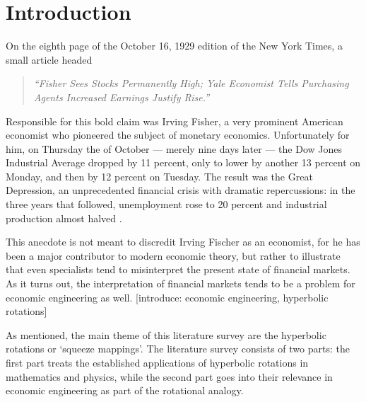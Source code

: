 \chapter{Introduction}
\label{chap:intro}
On the eighth page of the October 16, 1929 edition of the New York Times, a small article headed \cite{NYT1929}
\begin{quote}
    \emph{``Fisher Sees Stocks Permanently High; Yale Economist Tells Purchasing Agents Increased Earnings Justify Rise.''} 
\end{quote}
Responsible for this bold claim was Irving Fisher, a very prominent American economist who pioneered  the subject of monetary economics. Unfortunately for him, on Thursday the  of October --- merely nine days later --- the Dow Jones Industrial Average dropped by 11 percent, only to lower by another 13 percent on Monday, and then by 12 percent on Tuesday. The result was the Great Depression, an unprecedented financial crisis with dramatic repercussions: in the three years that followed, unemployment rose to 20 percent and industrial production almost halved \cite{gdepression}. 
 
This anecdote is not meant to discredit Irving Fischer as an economist, for he has been a major contributor to modern economic theory, but rather to illustrate that even specialists tend to misinterpret the present state of financial markets. As it turns out, the interpretation of financial markets tends to be a problem for economic engineering as well.  
[introduce: economic engineering, hyperbolic rotations]

As mentioned, the main theme of this literature survey are the hyperbolic rotations or `squeeze mappings'. The literature survey consists of two parts: the first part treats the established applications of hyperbolic rotations in mathematics and physics, while the second part goes into their relevance in economic engineering as part of the rotational analogy. 

